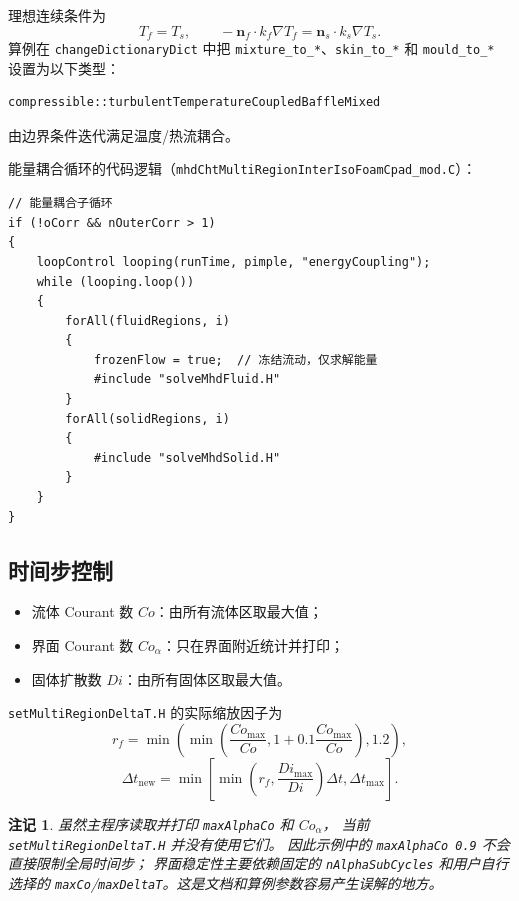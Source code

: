 \documentclass[11pt,a4paper]{article}
\newtheorem{remark}{注记}[section]
\begin{document}
理想连续条件为
\begin{equation}
T_f=T_s,\qquad
-\mathbf n_f\cdot k_f\nabla T_f
=\mathbf n_s\cdot k_s\nabla T_s .
\end{equation}
算例在 \texttt{changeDictionaryDict} 中把
\texttt{mixture\_to\_*}、\texttt{skin\_to\_*} 和
\texttt{mould\_to\_*} 设置为以下类型：
\begin{lstlisting}[style=cppstyle,numbers=none]
compressible::turbulentTemperatureCoupledBaffleMixed
\end{lstlisting}
由边界条件迭代满足温度/热流耦合。

能量耦合循环的代码逻辑（\texttt{mhdChtMultiRegionInterIsoFoamCpad\_mod.C}）：

\begin{lstlisting}[style=cppstyle]
// 能量耦合子循环
if (!oCorr && nOuterCorr > 1)
{
    loopControl looping(runTime, pimple, "energyCoupling");
    while (looping.loop())
    {
        forAll(fluidRegions, i)
        {
            frozenFlow = true;  // 冻结流动，仅求解能量
            #include "solveMhdFluid.H"
        }
        forAll(solidRegions, i)
        {
            #include "solveMhdSolid.H"
        }
    }
}
\end{lstlisting}

\subsection{时间步控制}

\begin{itemize}
    \item 流体 Courant 数 $Co$：由所有流体区取最大值；
    \item 界面 Courant 数 $Co_\alpha$：只在界面附近统计并打印；
    \item 固体扩散数 $Di$：由所有固体区取最大值。
\end{itemize}

\texttt{setMultiRegionDeltaT.H} 的实际缩放因子为
\begin{equation}
r_f=\min\left(
\min\left(\frac{Co_{\max}}{Co},1+0.1\frac{Co_{\max}}{Co}\right),
1.2\right),
\end{equation}
\begin{equation}
\Delta t_{\mathrm{new}}
=\min\left[
\min\left(r_f,\frac{Di_{\max}}{Di}\right)\Delta t,
\Delta t_{\max}
\right].
\end{equation}

\begin{remark}
虽然主程序读取并打印 \texttt{maxAlphaCo} 和 $Co_\alpha$，
当前 \texttt{setMultiRegionDeltaT.H} 并没有使用它们。
因此示例中的 \texttt{maxAlphaCo 0.9} 不会直接限制全局时间步；
界面稳定性主要依赖固定的 \texttt{nAlphaSubCycles} 和用户自行选择的
\texttt{maxCo}/\texttt{maxDeltaT}。这是文档和算例参数容易产生误解的地方。
\end{remark}
\end{document}
